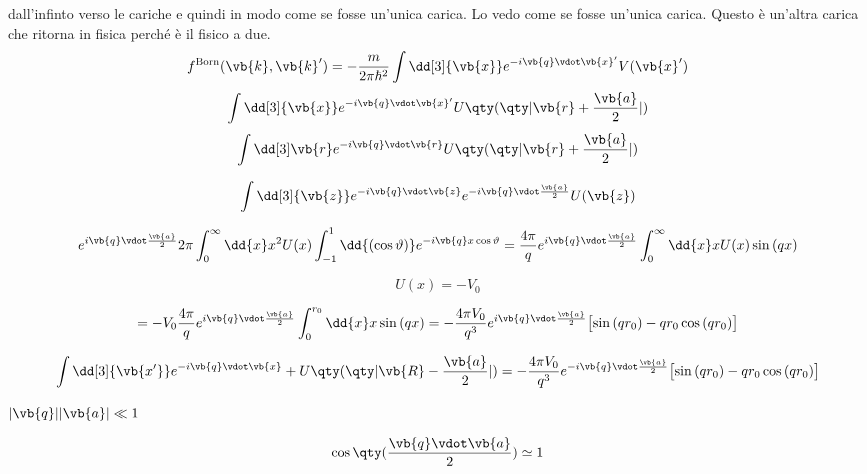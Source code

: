 \begin{soluzione}
{dall'infinto verso le cariche e quindi in modo come se fosse un'unica carica. Lo vedo come se fosse un'unica carica. Questo è un'altra carica che ritorna in fisica perché è il fisico a due.
   \begin{equation*}
      f^{\rm Born}(\vb{k},\vb{k}')
      =-\frac{m}{2\pi\hbar^2} \int \dd[3]{\vb{x}} e^{-i \vb{q} \vdot \vb{x}'} V(\vb{x}')
   \end{equation*}
   \begin{equation*}
      \int \dd[3]{\vb{x}} e^{-i \vb{q} \vdot \vb{x}'} U\qty( \qty| \vb{r} + \frac{\vb{a}}{2} | )
   \end{equation*}
   \begin{equation*}
      \int \dd[3]\vb{r} e^{-i \vb{q} \vdot \vb{r}} U\qty( \qty| \vb{r} + \frac{\vb{a}}{2} | )
   \end{equation*}

   \begin{equation*}
      \int \dd[3]{\vb{z}} e^{-i \vb{q} \vdot \vb{z}} e^{-i \vb{q} \vdot \frac{\vb{a}}{2}} U(\vb{z})
   \end{equation*}

   \begin{equation*}
      e^{i \vb{q} \vdot \frac{\vb{a}}{2}} 2\pi \int_{0}^{\infty} \dd{x} x^2 U(x) \int_{-1}^{1} \dd{(\cos{\vartheta})} e^{-i \vb{q} x \cos{\vartheta}}
      =\frac{4\pi}{q} e^{ i \vb{q} \vdot \frac{\vb{a}}{2} } \int_{0}^{\infty} \dd{x} x U(x) \sin{(qx)}
   \end{equation*}

   \begin{equation*}
      U(x)=-V_0
   \end{equation*}

   \begin{equation*}
      =-V_0 \frac{4\pi}{q} e^{i \vb{q} \vdot \frac{\vb{a}}{2} } \int_{0}^{r_0} \dd{x} x \sin{(qx)}
      =-\frac{4\pi V_0}{q^3} e^{ i \vb{q} \vdot \frac{\vb{a}}{2} } \bigl[ \sin{(qr_0)} - qr_0\cos{(qr_0)} \bigr]
   \end{equation*}

   \begin{equation*}
      \int \dd[3]{\vb{x'}} e^{-i \vb{q} \vdot \vb{x}} + U\qty( \qty| \vb{R} - \frac{\vb{a}}{2} | )
      =-\frac{4 \pi V_0}{q^3} e^{ -i \vb{q} \vdot \frac{\vb{a}}{2} } \bigl[ \sin{(qr_0)} - qr_0\cos{(qr_0)} \bigr]
   \end{equation*}

   $|\vb{q}||\vb{a}| \ll 1$

   \begin{equation*}
      \cos{ \qty( \frac{\vb{q} \vdot \vb{a}}{2} ) } \simeq 1
   \end{equation*}

}
\end{soluzione}
